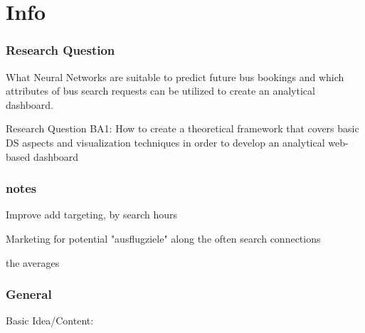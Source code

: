 %
%
% 
% 
% 

\chapter{Info}
\label{chap:info}

\subsection{Research Question}
What Neural Networks are suitable to predict future bus bookings and which attributes of bus search requests can be utilized to create an analytical dashboard.


Research Question BA1: How to create a theoretical framework that covers basic DS
aspects and visualization techniques in order to develop an analytical web-based dashboard


\subsection{notes}
Improve add targeting, by search hours

Marketing for potential "ausflugziele" along the often search connections 

the averages 



\subsection{General}
Basic Idea/Content: \newline

